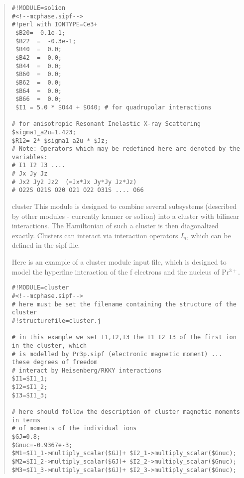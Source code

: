\begin{quote}
\begin{verbatim}
#!MODULE=so1ion
#<!--mcphase.sipf-->
#!perl with IONTYPE=Ce3+
 $B20=  0.1e-1;                                       
 $B22  =  -0.3e-1;
 $B40  =  0.0;
 $B42  =  0.0;
 $B44  =  0.0;
 $B60  =  0.0;
 $B62  =  0.0;
 $B64  =  0.0;
 $B66  =  0.0;
 $I1 = 5.0 * $O44 + $O40; # for quadrupolar interactions

# for anisotropic Resonant Inelastic X-ray Scattering
$sigma1_a2u=1.423;
$R12=-2* $sigma1_a2u * $Jz;
# Note: Operators which may be redefined here are denoted by the variables:
# I1 I2 I3 ....
# Jx Jy Jz
# Jx2 Jy2 Jz2  (=Jx*Jx Jy*Jy Jz*Jz)
# O22S O21S O20 O21 O22 O31S .... O66
\end{verbatim}

\item[{\prg cluster\index{cluster}}]
This module is designed to combine several subsystems (described
by other modules - currently kramer or so1ion) into a cluster with bilinear
interactions. The Hamiltonian of such a cluster is then
diagonalized exactly. Clusters can interact via interaction operators
$I_n$, which can be defined in the sipf file. 

Here is an example of a cluster module input file, which is designed
to model the hyperfine interaction of the f electrons and the nucleus
of Pr$^{3+}$.

\begin{verbatim}
#!MODULE=cluster
#<!--mcphase.sipf-->
# here must be set the filename containing the structure of the cluster
#!structurefile=cluster.j

# in this example we set I1,I2,I3 the I1 I2 I3 of the first ion in the cluster, which 
# is modelled by Pr3p.sipf (electronic magnetic moment) ... these degrees of freedom
# interact by Heisenberg/RKKY interactions
$I1=$I1_1;
$I2=$I1_2;
$I3=$I1_3;

# here should follow the description of cluster magnetic moments in terms
# of moments of the individual ions
$GJ=0.8;
$Gnuc=-0.9367e-3;
$M1=$I1_1->multiply_scalar($GJ)+ $I2_1->multiply_scalar($Gnuc);
$M2=$I1_2->multiply_scalar($GJ)+ $I2_2->multiply_scalar($Gnuc);
$M3=$I1_3->multiply_scalar($GJ)+ $I2_3->multiply_scalar($Gnuc); 
\end{verbatim}


\end{quote}
